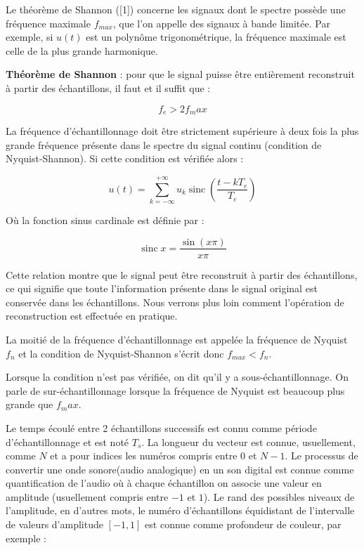 \documentclass[conference,onecolumn]{IEEEtran}
\DeclareMathOperator{\sinc}{sinc}
\begin{document}
Le théorème de Shannon ([1]) concerne les signaux dont le spectre possède une fréquence maximale $f_{max}$, que l'on appelle des signaux à bande limitée. Par exemple, si $u(t)$ est un polynôme trigonométrique, la fréquence maximale est celle de la plus grande harmonique.

\textbf{Théorème de Shannon} : pour que le signal puisse être entièrement reconstruit à partir des échantillons, il faut et il suffit que : 

\begin{equation}
    f_e > 2f_max
\end{equation}

La fréquence d'échantillonnage doit être strictement supérieure à deux fois la plus grande fréquence présente dans le spectre du signal continu (condition de Nyquist-Shannon). Si cette condition est vérifiée alors : 

\begin{equation}
    u(t) = \sum_{k = -\infty}^{+\infty} u_k\sinc({\frac{t-kT_e}{T_e}})
\end{equation}

Où la fonction sinus cardinale est définie par : 

\begin{equation}
    \sinc{x} = \frac{\sin{(x\pi)}}{x\pi}
\end{equation}

Cette relation montre que le signal peut être reconstruit à partir des échantillons, ce qui signifie que toute l'information présente dans le signal original est conservée dans les échantillons. Nous verrons plus loin comment l'opération de reconstruction est effectuée en pratique. 

La moitié de la fréquence d'échantillonnage est appelée la fréquence de Nyquist $f_n$ et la condition de Nyquist-Shannon s'écrit donc $f_{max}<f_n$. 

Lorsque la condition n'est pas vérifiée, on dit qu'il y a sous-échantillonnage. On parle de sur-échantillonnage lorsque la fréquence de Nyquist est beaucoup plus grande que $f_max$. 

Le temps écoulé entre 2 échantillons successifs est connu comme période d’échantillonnage et est noté $T_s$. La longueur du vecteur est connue, usuellement, comme $N$ et a pour indices les numéros compris entre $0$ et $N-1$. Le processus de convertir une onde sonore(audio analogique) en un son digital est connue comme quantification de l’audio où à chaque échantillon on associe une valeur en amplitude (usuellement compris entre $-1$ et $1$). Le rand des possibles niveaux de l’amplitude, en d’autres mots,  le numéro d’échantillons équidistant de l’intervalle de valeurs d’amplitude $[-1, 1]$ est connue comme profondeur de couleur, par exemple :
\end{document}

